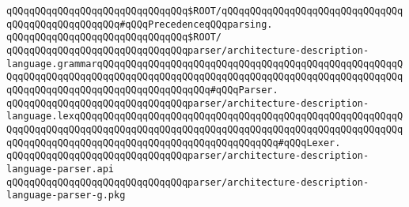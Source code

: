 \newline
\verb|qQQqqQQqqQQqqQQqqQQqqQQqqQQqqQQq$ROOT/|\verb|qQQqqQQqqQQqqQQqqQQqqQQqqQQqqQQqqQQqqQQqqQQqqQQqqQQq#qQQqPrecedenceqQQqparsing.|\newline
\verb|qQQqqQQqqQQqqQQqqQQqqQQqqQQqqQQq$ROOT/|\newline
\newline
\verb|qQQqqQQqqQQqqQQqqQQqqQQqqQQqqQQqparser/architecture-description-language.grammarqQQqqQQqqQQqqQQqqQQqqQQqqQQqqQQqqQQqqQQqqQQqqQQqqQQqqQQqqQQqqQQqqQQqqQQqqQQqqQQqqQQqqQQqqQQqqQQqqQQqqQQqqQQqqQQqqQQqqQQqqQQqqQQqqQQqqQQqqQQqqQQqqQQqqQQqqQQqqQQq#qQQqParser.|\newline
\verb|qQQqqQQqqQQqqQQqqQQqqQQqqQQqqQQqparser/architecture-description-language.lexqQQqqQQqqQQqqQQqqQQqqQQqqQQqqQQqqQQqqQQqqQQqqQQqqQQqqQQqqQQqqQQqqQQqqQQqqQQqqQQqqQQqqQQqqQQqqQQqqQQqqQQqqQQqqQQqqQQqqQQqqQQqqQQqqQQqqQQqqQQqqQQqqQQqqQQqqQQqqQQqqQQqqQQqqQQqqQQq#qQQqLexer.|\newline
\newline
\verb|qQQqqQQqqQQqqQQqqQQqqQQqqQQqqQQqparser/architecture-description-language-parser.api|\newline
\verb|qQQqqQQqqQQqqQQqqQQqqQQqqQQqqQQqparser/architecture-description-language-parser-g.pkg|\newline
\newline

